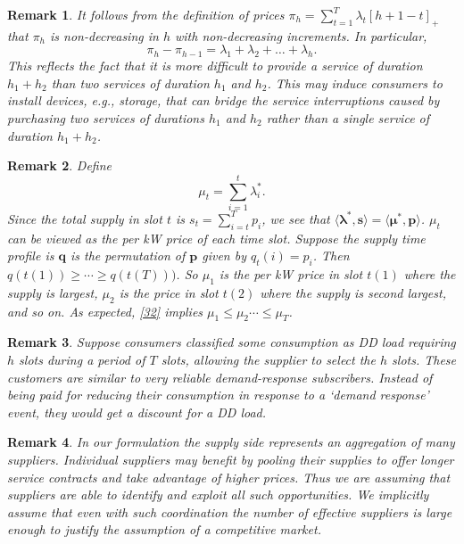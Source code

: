 \documentclass[10pt,draftcls,onecolumn]{IEEEtran}
\newtheorem{remark}{Remark}
\let \VEC \mathbf
\newcounter{l1}
\newcounter{l2}
\newcounter{l3}
\newcommand{\la}{\langle}
\renewcommand{\ll}{\lambda}
\begin{document}
\begin{remark}
It follows from the definition of prices $\pi_h =\sum_{t=1}^T\lambda_t[h+1-t]_+ $ that $\pi_h$ is non-decreasing in $h$ with non-decreasing increments. In particular,
\[\pi_h-\pi_{h-1} = \lambda_1 + \lambda_2+\ldots + \lambda_h.\]
 This reflects the fact that it is more difficult to provide  a service of duration $h_1 + h_2$ than
two services of duration $h_1$ and $h_2$.    This may induce consumers 
 to install devices, e.g., storage, that can bridge the service interruptions caused by purchasing two services of durations $h_1$ and $h_2$ rather than a single service of duration $h_1 + h_2$.
\end{remark}

\begin{remark}
\label{remarkslot}
Define 
\begin{equation}
\mu_t=\sum_{i=1}^t \lambda_i^* . \label{32}
\end{equation}
Since the total supply in slot $t$ is $s_t = \sum_{i=t}^T p_i$, we see that $ \la \boldsymbol \ll^*, \boldsymbol s\rangle = \la \boldsymbol \mu^*, \boldsymbol p \rangle$.  $\mu_t$ can be viewed as the per kW price  of each time slot. Suppose the supply time profile is $\VEC q$ is the permutation of $\VEC p$ given by $q_t(i) = p_i$.  Then $q(t(1)) \ge \cdots \ge 
q(t(T)))$.  So $\mu_1$ is the per kW price in slot $t(1)$ where the supply is largest, $\mu_2$ is the price in slot $t(2)$ where the supply is second largest, and so on.  As expected, \eqref{32} implies $\mu_1 \le \mu_2 \cdots \leq \mu_T$.
\end{remark}

\begin{remark}
Suppose consumers classified some consumption as DD load  requiring $h$ slots during a  period of $T$ slots, allowing the supplier to
select the $h$ slots.  These customers are similar to very reliable demand-response subscribers.  Instead of being paid for reducing their consumption in response to a `demand response' event, they would get a discount for a DD load.
\end{remark}
\begin{remark}{ In our formulation the supply side represents an aggregation of many suppliers.  Individual suppliers may benefit by pooling their supplies to offer longer service contracts and take advantage of higher prices.  Thus we are assuming that  suppliers are able to identify and exploit all such opportunities.  We implicitly assume that even with such coordination the number of effective suppliers is large enough to justify the assumption of a competitive market. }
\end{remark}
\end{document}
